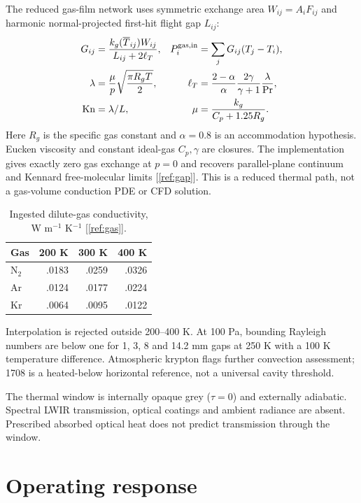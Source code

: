 \documentclass[11pt,a4paper]{article}
\begin{document}
The reduced gas-film network uses symmetric exchange area $W_{ij}=A_iF_{ij}$
and harmonic normal-projected first-hit flight gap $L_{ij}$:
\begin{align}
G_{ij}&=\frac{k_g(\overline T_{ij})W_{ij}}{L_{ij}+2\ell_T},&
P_i^{\rm gas,in}&=\sum_jG_{ij}(T_j-T_i),\\
\lambda&=\frac{\mu}{p}\sqrt{\frac{\pi R_gT}{2}},&
\ell_T&=\frac{2-\alpha}{\alpha}\frac{2\gamma}{\gamma+1}\frac{\lambda}{\mathrm{Pr}},\\
\mathrm{Kn}&=\lambda/L,&\mu&=\frac{k_g}{C_p+1.25R_g}.
\end{align}
Here $R_g$ is the specific gas constant and $\alpha=0.8$ is an accommodation
hypothesis. Eucken viscosity and constant ideal-gas $C_p,\gamma$ are closures.
The implementation gives exactly zero gas exchange at $p=0$ and recovers
parallel-plane continuum and Kennard free-molecular limits [\ref{ref:gap}].
This is a reduced thermal path, not a gas-volume conduction PDE or CFD solution.

\begin{table}[!ht]\centering\caption{Ingested dilute-gas conductivity, W m$^{-1}$ K$^{-1}$ [\ref{ref:gas}].}
\begin{tabular}{lrrr}\toprule Gas & 200 K & 300 K & 400 K\\\midrule
N$_2$ & .0183 & .0259 & .0326\\ Ar & .0124 & .0177 & .0224\\ Kr & .0064 & .0095 & .0122\\\bottomrule
\end{tabular}\end{table}
Interpolation is rejected outside 200--400 K. At 100 Pa, bounding Rayleigh
numbers are below one for 1, 3, 8 and 14.2 mm gaps at 250 K with a 100 K
temperature difference. Atmospheric krypton flags further convection assessment;
1708 is a heated-below horizontal reference, not a universal cavity threshold.

The thermal window is internally opaque grey ($\tau=0$) and externally adiabatic.
Spectral LWIR transmission, optical coatings and ambient radiance are absent.
Prescribed absorbed optical heat does not predict transmission through the window.
\clearpage
\section{Operating response}
\end{document}
